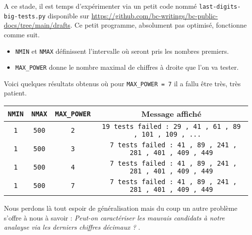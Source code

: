 A ce stade, il est temps d'expérimenter via un petit code nommé \verb+last-digits-big-tests.py+ disponible sur \url{https://github.com/bc-writings/bc-public-docs/tree/main/drafts}.
Ce petit programme, absolument pas optimisé, fonctionne comme suit.

\begin{itemize}[label=\small\textbullet]
	\item \verb+NMIN+ et \verb+NMAX+ définissent l'intervalle où seront pris les nombres premiers.

	\item \verb+MAX_POWER+ donne le nombre maximal de chiffres à droite que l'on va tester.
\end{itemize}

Voici quelques résultats obtenus où pour \verb+MAX_POWER = 7+ il a fallu être très, très patient.

\begin{center}
\begin{tabular}{|c|c|c|c|}
	\hline
	\verb+NMIN+ & \verb+NMAX+ & \verb+MAX_POWER+
    & Message affiché
	\\
	\hline
    \verb+1+ & \verb+500+ & \verb+2+
    & \verb+19 tests failed : 29 , 41 , 61 , 89 , 101 , 109 , ...  +
	\\
	\hline
    \verb+1+ & \verb+500+ & \verb+3+
    & \verb+ 7 tests failed : 41 , 89 , 241 , 281 , 401 , 409 , 449+
	\\
	\hline
    \verb+1+ & \verb+500+ & \verb+4+
    & \verb+ 7 tests failed : 41 , 89 , 241 , 281 , 401 , 409 , 449+
	\\
	\hline
    \verb+1+ & \verb+500+ & \verb+7+
    & \verb+ 7 tests failed : 41 , 89 , 241 , 281 , 401 , 409 , 449+
	\\
	\hline
\end{tabular}
\end{center}


\medskip

Nous perdons là tout espoir de généralisation mais du coup un autre problème s'offre à nous à savoir : \emph{\og Peut-on caractériser les mauvais candidats à notre analayse via les derniers chiffres décimaux ? \fg}.
